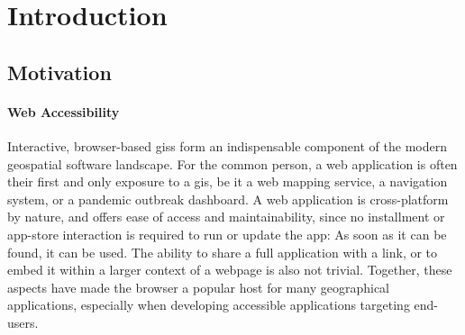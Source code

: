 \chapter{Introduction}

\section{Motivation}


\subsubsection*{ Web Accessibility }
Interactive, browser-based \ac{giss} form an indispensable component of the modern geospatial software landscape. 
For the common person, a web application is often their first and only exposure to a \acs{gis}, be it a web mapping service, a navigation system, or a pandemic outbreak dashboard. 
A web application is cross-platform by nature, and offers ease of access and maintainability, since no installment or app-store interaction is required to run or update the app: 
As soon as it can be found, it can be used.
The ability to share a full application with a link, or to embed it within a larger context of a webpage is also not trivial. 
Together, these aspects have made the browser a popular host for many geographical applications, especially when developing accessible applications targeting end-users. 







